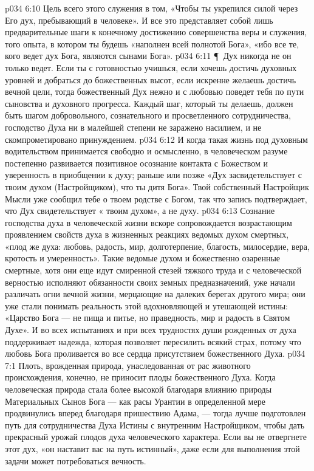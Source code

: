 \vs p034 6:10 Цель всего этого служения в том, «Чтобы ты укрепился силой через Его дух, пребывающий в человеке». И все это представляет собой лишь предварительные шаги к конечному достижению совершенства веры и служения, того опыта, в котором ты будешь «наполнен всей полнотой Бога», «ибо все те, кого ведет дух Бога, являются сынами Бога».
\vs p034 6:11 \P\ Дух никогда не  он только ведет. Если ты с готовностью учишься, если хочешь достичь духовных уровней и добраться до божественных высот, если искренне желаешь достичь вечной цели, тогда божественный Дух нежно и с любовью поведет тебя по пути сыновства и духовного прогресса. Каждый шаг, который ты делаешь, должен быть шагом добровольного, сознательного и просветленного сотрудничества, господство Духа ни в малейшей степени не заражено насилием, и не скомпрометировано принуждением.
\vs p034 6:12 И когда такая жизнь под духовным водительством принимается свободно и осмысленно, в человеческом разуме постепенно развивается позитивное осознание контакта с Божеством и уверенность в приобщении к духу; раньше или позже «Дух засвидетельствует с твоим духом (Настройщиком), что ты дитя Бога». Твой собственный Настройщик Мысли уже сообщил тебе о твоем родстве с Богом, так что запись подтверждает, что Дух свидетельствует « твоим духом», а не  духу.
\vs p034 6:13 Сознание господства духа в человеческой жизни вскоре сопровождается возрастающим проявлением свойств духа в жизненных реакциях ведомых духом смертных, «плод же духа: любовь, радость, мир, долготерпение, благость, милосердие, вера, кротость и умеренность». Такие ведомые духом и божественно озаренные смертные, хотя они еще идут смиренной стезей тяжкого труда и с человеческой верностью исполняют обязанности своих земных предназначений, уже начали различать огни вечной жизни, мерцающие на далеких берегах другого мира; они уже стали понимать реальность этой вдохновляющей и утешающей истины: «Царство Бога --- не пища и питье, но праведность, мир и радость в Святом Духе». И во всех испытаниях и при всех трудностях души рожденных от духа поддерживает надежда, которая позволяет пересилить всякий страх, потому что любовь Бога проливается во все сердца присутствием божественного Духа.
\vs p034 7:1 Плоть, врожденная природа, унаследованная от рас животного происхождения, конечно, не приносит плоды божественного Духа. Когда человеческая природа стала более высокой благодаря влиянию природы Материальных Сынов Бога --- как расы Урантии в определенной мере продвинулись вперед благодаря пришествию Адама, --- тогда лучше подготовлен путь для сотрудничества Духа Истины с внутренним Настройщиком, чтобы дать прекрасный урожай плодов духа человеческого характера. Если вы не отвергнете этот дух, «он наставит вас на путь истинный», даже если для выполнения этой задачи может потребоваться вечность.
